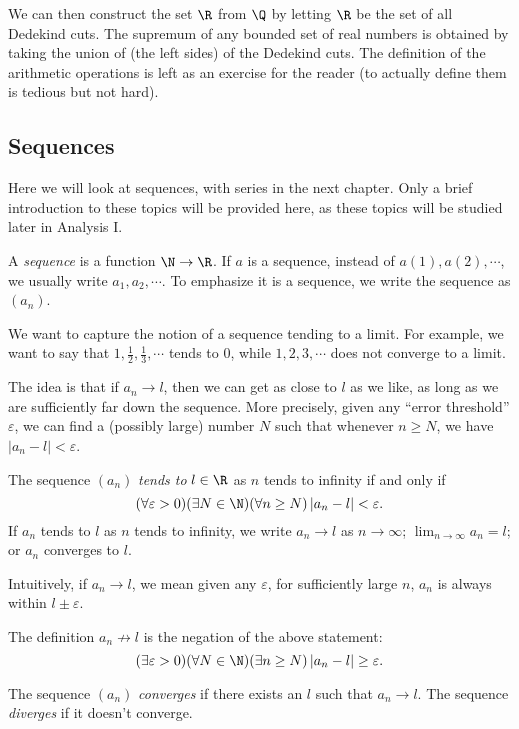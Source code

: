 \documentclass[a4paper]{article}
\begin{document}
We can then construct the set $\R$ from $\Q$ by letting $\R$ be the set of all Dedekind cuts. The supremum of any bounded set of real numbers is obtained by taking the union of (the left sides) of the Dedekind cuts. The definition of the arithmetic operations is left as an exercise for the reader (to actually define them is tedious but not hard).

\subsection{Sequences}
Here we will look at sequences, with series in the next chapter. Only a brief introduction to these topics will be provided here, as these topics will be studied later in Analysis I.

\begin{defi}[Sequence]
  A \emph{sequence} is a function $\N\to \R$. If $a$ is a sequence, instead of $a(1), a(2), \cdots$, we usually write $a_1, a_2, \cdots$. To emphasize it is a sequence, we write the sequence as $(a_n)$.
\end{defi}
We want to capture the notion of a sequence tending to a limit. For example, we want to say that $1, \frac{1}{2}, \frac{1}{3}, \cdots$ tends to $0$, while $1, 2, 3, \cdots$ does not converge to a limit.

The idea is that if $a_n \to l$, then we can get as close to $l$ as we like, as long as we are sufficiently far down the sequence. More precisely, given any ``error threshold'' $\varepsilon$, we can find a (possibly large) number $N$ such that whenever $n \geq N$, we have $|a_n - l| < \varepsilon$.

\begin{defi}
  The sequence $(a_n)$ \emph{tends to} $l\in \R$ as $n$ tends to infinity if and only if
  \[
    (\forall \varepsilon > 0)(\exists N \in \N)(\forall n \geq N)\,|a_n - l| < \varepsilon.
  \]
  If $a_n$ tends to $l$ as $n$ tends to infinity, we write $a_n \to l$ as $n\to \infty$; $\displaystyle \lim_{n \to \infty} a_n = l$; or $a_n$ converges to $l$.
\end{defi}
Intuitively, if $a_n \to l$, we mean given any $\varepsilon$, for sufficiently large $n$, $a_n$ is always within $l\pm \varepsilon$.

The definition $a_n\not\to l$ is the negation of the above statement:
\[
  (\exists \varepsilon > 0)(\forall N\in \N)(\exists n\geq N)\,|a_n - l| \geq \varepsilon.
\]

\begin{defi}
  The sequence $(a_n)$ \emph{converges} if there exists an $l$ such that $a_n\to l$. The sequence \emph{diverges} if it doesn't converge.
\end{defi}
\end{document}
